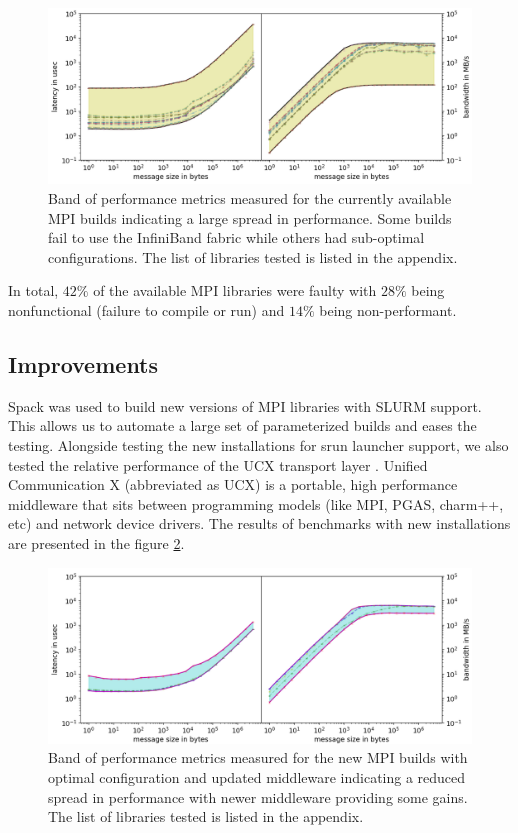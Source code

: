 \documentclass[sigconf,authordraft]{acmart}
\begin{document}
\begin{figure}[h]
	\centering
	\includegraphics[width=1.05\linewidth]{curr_pearc}
	\caption{Band of performance metrics measured for the currently
			 available MPI builds indicating a large spread in 
			 performance. Some builds fail to use the InfiniBand fabric while others had sub-optimal configurations. The list of libraries tested is listed in the appendix.}
	\label{fig:currmpi}
\end{figure}

In total, $42\%$ of the available MPI libraries were faulty with $28\%$ being nonfunctional (failure to compile or run) and $14\%$ being non-performant.

\subsection{Improvements}
 
Spack\cite{spack} was used to build new versions of MPI libraries with SLURM support. This allows us to automate a large set of parameterized builds and eases the testing. Alongside testing the new installations for srun launcher support, we also tested the relative performance of the UCX transport layer \cite{shamis2015ucx,openucx-website}. Unified Communication X (abbreviated as UCX) is a portable, high performance middleware that sits between programming models (like MPI, PGAS, charm++, etc) and network device drivers. The results of benchmarks with new installations are presented in the figure \ref{fig:newmpi}. 

\begin{figure}[h]
	\centering
	\includegraphics[width=1.05\linewidth]{new_pearc}
	\caption{Band of performance metrics measured for the new MPI
		builds with optimal configuration and updated middleware
		indicating a reduced spread in performance with newer middleware providing some gains. The list of libraries tested is listed in the appendix.}
	\label{fig:newmpi}
\end{figure}
\end{document}
